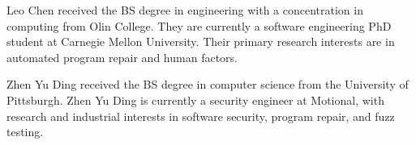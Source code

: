 \documentclass[10pt,journal,compsoc]{IEEEtran}
\begin{document}
\ifCLASSOPTIONcaptionsoff
  \newpage
\fi







% 
\begin{IEEEbiography}{Leo Chen}
    received the BS degree in engineering with a concentration in computing from Olin College.
    They are currently a software engineering PhD student at Carnegie Mellon University.
    Their primary research interests are in automated program repair and human factors.
    
\end{IEEEbiography}


\begin{IEEEbiography}{Zhen Yu Ding}
    received the BS degree in computer science from the University of Pittsburgh.
    Zhen Yu Ding is currently a security engineer at Motional, with research and
    industrial interests in software security, program repair, and fuzz testing.
\end{IEEEbiography}
\end{document}
